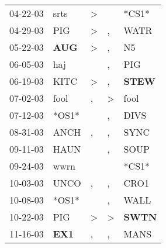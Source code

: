 \begin{supertabular}{p{0.07\textwidth}p{0.06\textwidth}p{0.02\textwidth}p{0.02\textwidth}p{0.06\textwidth}}
          04-22-03\textsuperscript{} &           srts\textsuperscript{} &     \textgreater &                  &                            *CS1* \\
          04-29-03\textsuperscript{} &            PIG\textsuperscript{} &     \textgreater &                , &           WATR\textsuperscript{} \\
          05-22-03\textsuperscript{} &   \textbf{AUG\textsuperscript{}} &     \textgreater &                , &             N5\textsuperscript{} \\
          06-05-03\textsuperscript{} &            haj\textsuperscript{} &                  &                , &            PIG\textsuperscript{} \\
          06-19-03\textsuperscript{} &           KITC\textsuperscript{} &     \textgreater &                , &  \textbf{STEW\textsuperscript{}} \\
          07-02-03\textsuperscript{} &           fool\textsuperscript{} &                , &     \textgreater &           fool\textsuperscript{} \\
          07-12-03\textsuperscript{} &                            *OS1* &                  &                , &           DIVS\textsuperscript{} \\
          08-31-03\textsuperscript{} &           ANCH\textsuperscript{} &                , &                , &           SYNC\textsuperscript{} \\
          09-11-03\textsuperscript{} &           HAUN\textsuperscript{} &                  &                , &           SOUP\textsuperscript{} \\
          09-24-03\textsuperscript{} &           wwrn\textsuperscript{} &                  &                  &                            *CS1* \\
          10-03-03\textsuperscript{} &           UNCO\textsuperscript{} &                , &                , &           CRO1\textsuperscript{} \\
          10-08-03\textsuperscript{} &                            *OS1* &                  &                , &           WALL\textsuperscript{} \\
          10-22-03\textsuperscript{} &            PIG\textsuperscript{} &     \textgreater &     \textgreater &  \textbf{SWTN\textsuperscript{}} \\
          11-16-03\textsuperscript{} &   \textbf{EX1\textsuperscript{}} &                , &                , &           MANS\textsuperscript{} \\

\end{supertabular}

